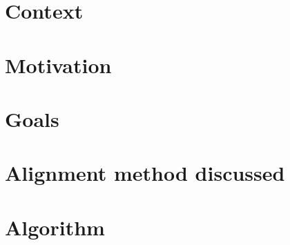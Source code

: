 \section{Context}

\section{Motivation}

\section{Goals}

\section{Alignment method discussed}

\section{Algorithm}
